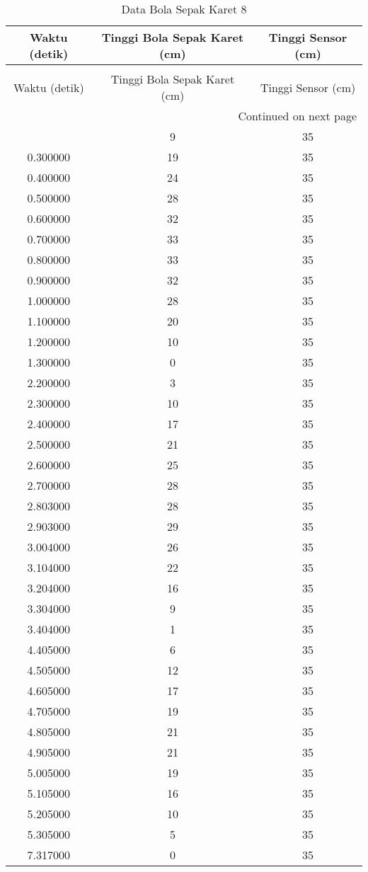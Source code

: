 \begin{longtable}[htbp]{|c|c|c|}
\caption{Data Bola Sepak Karet 8} \\
\hline
Waktu (detik) & Tinggi Bola Sepak Karet (cm) & Tinggi Sensor (cm) \\ \hline
\endfirsthead
\caption[]{Data Bola Sepak Karet 8} \\
\hline
Waktu (detik) & Tinggi Bola Sepak Karet (cm) & Tinggi Sensor (cm) \\ \hline
\endhead
\multicolumn{3}{r}{Continued on next page} \\
\endfoot
\endlastfoot
0.200000 & 9 & 35 \\ \hline
0.300000 & 19 & 35 \\ \hline
0.400000 & 24 & 35 \\ \hline
0.500000 & 28 & 35 \\ \hline
0.600000 & 32 & 35 \\ \hline
0.700000 & 33 & 35 \\ \hline
0.800000 & 33 & 35 \\ \hline
0.900000 & 32 & 35 \\ \hline
1.000000 & 28 & 35 \\ \hline
1.100000 & 20 & 35 \\ \hline
1.200000 & 10 & 35 \\ \hline
1.300000 & 0 & 35 \\ \hline
2.200000 & 3 & 35 \\ \hline
2.300000 & 10 & 35 \\ \hline
2.400000 & 17 & 35 \\ \hline
2.500000 & 21 & 35 \\ \hline
2.600000 & 25 & 35 \\ \hline
2.700000 & 28 & 35 \\ \hline
2.803000 & 28 & 35 \\ \hline
2.903000 & 29 & 35 \\ \hline
3.004000 & 26 & 35 \\ \hline
3.104000 & 22 & 35 \\ \hline
3.204000 & 16 & 35 \\ \hline
3.304000 & 9 & 35 \\ \hline
3.404000 & 1 & 35 \\ \hline
4.405000 & 6 & 35 \\ \hline
4.505000 & 12 & 35 \\ \hline
4.605000 & 17 & 35 \\ \hline
4.705000 & 19 & 35 \\ \hline
4.805000 & 21 & 35 \\ \hline
4.905000 & 21 & 35 \\ \hline
5.005000 & 19 & 35 \\ \hline
5.105000 & 16 & 35 \\ \hline
5.205000 & 10 & 35 \\ \hline
5.305000 & 5 & 35 \\ \hline
7.317000 & 0 & 35 \\ \hline
\end{longtable}
